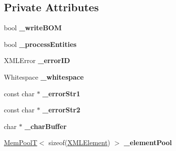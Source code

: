 \subsection*{Private Attributes}
\begin{DoxyCompactItemize}
\item 
\hypertarget{classtinyxml2_1_1_x_m_l_document_a1dbdc7feaa58007403c20243ac5abbd3}{}bool {\bfseries \+\_\+write\+B\+O\+M}\label{classtinyxml2_1_1_x_m_l_document_a1dbdc7feaa58007403c20243ac5abbd3}

\item 
\hypertarget{classtinyxml2_1_1_x_m_l_document_a9f768cb74fb5ccbadeffa436916f0194}{}bool {\bfseries \+\_\+process\+Entities}\label{classtinyxml2_1_1_x_m_l_document_a9f768cb74fb5ccbadeffa436916f0194}

\item 
\hypertarget{classtinyxml2_1_1_x_m_l_document_a61270d643f810975656da2054e1e1622}{}X\+M\+L\+Error {\bfseries \+\_\+error\+I\+D}\label{classtinyxml2_1_1_x_m_l_document_a61270d643f810975656da2054e1e1622}

\item 
\hypertarget{classtinyxml2_1_1_x_m_l_document_a5342ed1e7dc1fe6afc81d4740c465320}{}Whitespace {\bfseries \+\_\+whitespace}\label{classtinyxml2_1_1_x_m_l_document_a5342ed1e7dc1fe6afc81d4740c465320}

\item 
\hypertarget{classtinyxml2_1_1_x_m_l_document_a40948cedd3c1a0b19af0d483651e6aa8}{}const char $\ast$ {\bfseries \+\_\+error\+Str1}\label{classtinyxml2_1_1_x_m_l_document_a40948cedd3c1a0b19af0d483651e6aa8}

\item 
\hypertarget{classtinyxml2_1_1_x_m_l_document_a6627d1da446d48eefb03a86850e9bf6d}{}const char $\ast$ {\bfseries \+\_\+error\+Str2}\label{classtinyxml2_1_1_x_m_l_document_a6627d1da446d48eefb03a86850e9bf6d}

\item 
\hypertarget{classtinyxml2_1_1_x_m_l_document_a7913ff24220a40e2e2b49a5137b43d29}{}char $\ast$ {\bfseries \+\_\+char\+Buffer}\label{classtinyxml2_1_1_x_m_l_document_a7913ff24220a40e2e2b49a5137b43d29}

\item 
\hypertarget{classtinyxml2_1_1_x_m_l_document_a21574fba363a0d23bfc820d1652ab8bc}{}\hyperlink{classtinyxml2_1_1_mem_pool_t}{Mem\+Pool\+T}$<$ sizeof(\hyperlink{classtinyxml2_1_1_x_m_l_element}{X\+M\+L\+Element}) $>$ {\bfseries \+\_\+element\+Pool}\label{classtinyxml2_1_1_x_m_l_document_a21574fba363a0d23bfc820d1652ab8bc}


\end{DoxyCompactItemize}
